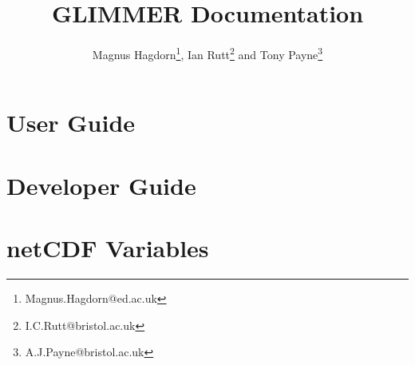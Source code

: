 

\frontmatter
\title{GLIMMER Documentation}
\author{Magnus Hagdorn\thanks{Magnus.Hagdorn@ed.ac.uk}, Ian
  Rutt\thanks{I.C.Rutt@bristol.ac.uk} and Tony Payne\thanks{A.J.Payne@bristol.ac.uk}}
\maketitle
\tableofcontents

\mainmatter
\chapter{User Guide}
\newcommand{\dir}{ug}


\chapter{Developer Guide}
\renewcommand{\dir}{dg}


\appendix
\renewcommand{\dir}{ug}
\chapter{netCDF Variables}

